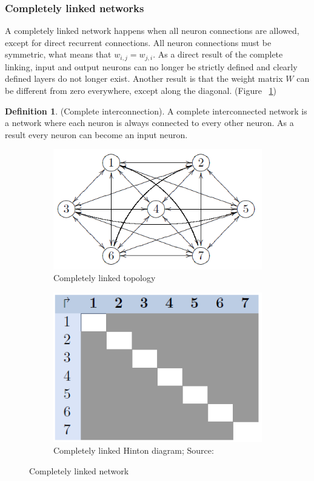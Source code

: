 \documentclass[pdftex,a4paper,12pt,twoside]{report}
\theoremstyle{plain} \newtheorem{theorem}{Theorem} \newtheorem{proposition}{Proposition} \newtheorem{lemma}{Lemma} \newtheorem*{corollary}{Corollary}
\theoremstyle{definition} \newtheorem{definition}{Definition} \newtheorem{conjecture}{Conjecture} \newtheorem*{example}{Example} \newtheorem{algorithm}{Algorithm}
\theoremstyle{remark} \newtheorem*{remark}{Remark} \newtheorem*{note}{Note} \newtheorem{case}{Case}
\begin{document}
\subsubsection{Completely linked networks}
A completely linked network happens when all neuron connections are allowed, except for direct recurrent connections. All neuron connections must be symmetric, what means that $w_{i,j} = w_{j,i}$. As a direct result of the complete linking, input and output neurons can no longer be strictly defined and clearly defined layers do not longer exist. Another result is that the weight matrix $W$ can be different from zero everywhere, except along the diagonal. (Figure ~\ref{fig:completelylinked})
\begin{definition}
(Complete interconnection). A complete interconnected network is a network where each neuron is always connected to every other neuron. As a result every neuron can become an input neuron.
\end{definition}
\begin{figure}
\centering
	\begin{subfigure}[b]{0.49\textwidth}
	\centering
	\includegraphics[width=\textwidth]{./img/Completelylinked-Topology.png}
	\caption{Completely linked topology}
	\end{subfigure}
	\begin{subfigure}[b]{0.49\textwidth}
	\centering
	\includegraphics[width=\textwidth]{./img/Completelylinked-Hinton.png}
	\caption{Completely linked Hinton diagram; Source:\citep{Kriesel2013}}
	\end{subfigure}
\caption{Completely linked network}
\label{fig:completelylinked}
\end{figure}
\end{document}
